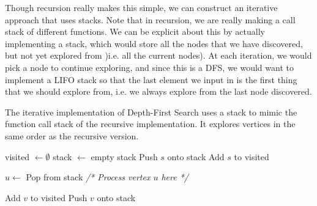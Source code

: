   Though recursion really makes this simple, we can construct an iterative approach that uses stacks. Note that in recursion, we are really making a call stack of different functions. We can be explicit about this by actually implementing a stack, which would store all the nodes that we have discovered, but not yet explored from )i.e. all the current nodes). At each iteration, we would pick a node to continue exploring, and since this is a DFS, we would want to implement a LIFO stack so that the last element we input in is the first thing that we should explore from, i.e. we always explore from the last node discovered. 

  \begin{algo}
    The iterative implementation of Depth-First Search uses a stack to mimic the function call stack of the recursive implementation. It explores vertices in the same order as the recursive version.
    \begin{algorithm}[H]
      \label{alg:dfs_iterative}
      \begin{algorithmic}[1]
        
          \State visited $\gets \emptyset$ 
          \State stack $\gets$ empty stack
          \State Push $s$ onto stack
          \State Add $s$ to visited
          
            \State $u \gets$ Pop from stack
            \State \textit{/* Process vertex $u$ here */}
            
                \State Add $v$ to visited
                \State Push $v$ onto stack
              \EndIf
            \EndFor
          \EndWhile
        \EndFunction
      \end{algorithmic}
    \end{algorithm}
  \end{algo}

